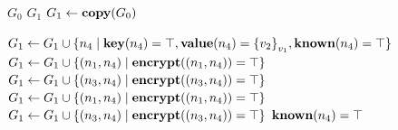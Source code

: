 \documentclass[]{article}
\begin{document}
\begin{algorithm}
    \caption{Encrypt}
    \begin{algorithmic}
        \Require $G_0$
        \Ensure $G_1$
        \State $G_1 \gets \textbf{copy}(G_0)$



        \State $G_1 \gets G_1 \cup \{ n_4 \mid \textbf{key}(n_4) = \top, \textbf{value}(n_4) = {\{v_2\}}_{v_1}, \textbf{known}(n_4) = \top \}$
        \State $G_1 \gets G_1 \cup \{ (n_1,n_4) \mid \textbf{encrypt}((n_1,n_4)) = \top \}$
        \State $G_1 \gets G_1 \cup \{ (n_3,n_4) \mid \textbf{encrypt}((n_3,n_4)) = \top \}$
        \Else
        \State $G_1 \gets G_1 \cup \{ (n_1,n_4) \mid \textbf{encrypt}((n_1,n_4)) = \top \}$
        \State $G_1 \gets G_1 \cup \{ (n_3,n_4) \mid \textbf{encrypt}((n_3,n_4)) = \top \}$
        \EndIf
        \State $\textbf{known}(n_4) = \top$
        \EndIf
        \EndIf
        \EndFor
        \EndFor
    \end{algorithmic}
\end{algorithm}
\end{document}
